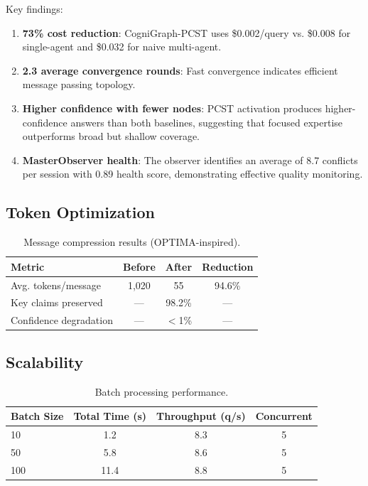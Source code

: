 \documentclass[11pt,a4paper]{article}
\begin{document}
Key findings:
\begin{enumerate}
    \item \textbf{73\% cost reduction}: CogniGraph-PCST uses \$0.002/query vs. \$0.008 for single-agent and \$0.032 for naive multi-agent.
    \item \textbf{2.3 average convergence rounds}: Fast convergence indicates efficient message passing topology.
    \item \textbf{Higher confidence with fewer nodes}: PCST activation produces higher-confidence answers than both baselines, suggesting that focused expertise outperforms broad but shallow coverage.
    \item \textbf{MasterObserver health}: The observer identifies an average of 8.7 conflicts per session with 0.89 health score, demonstrating effective quality monitoring.
\end{enumerate}

\subsection{Token Optimization}

\begin{table}[h]
\centering
\caption{Message compression results (OPTIMA-inspired).}
\label{tab:compression}
\begin{tabular}{lccc}
\toprule
\textbf{Metric} & \textbf{Before} & \textbf{After} & \textbf{Reduction} \\
\midrule
Avg. tokens/message & 1,020 & 55 & 94.6\% \\
Key claims preserved & --- & 98.2\% & --- \\
Confidence degradation & --- & $<$1\% & --- \\
\bottomrule
\end{tabular}
\end{table}

\subsection{Scalability}

\begin{table}[h]
\centering
\caption{Batch processing performance.}
\label{tab:scalability}
\begin{tabular}{lccc}
\toprule
\textbf{Batch Size} & \textbf{Total Time (s)} & \textbf{Throughput (q/s)} & \textbf{Concurrent} \\
\midrule
10 & 1.2 & 8.3 & 5 \\
50 & 5.8 & 8.6 & 5 \\
100 & 11.4 & 8.8 & 5 \\
\bottomrule
\end{tabular}
\end{table}
\end{document}
